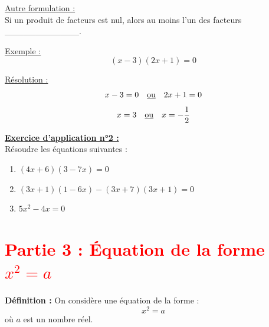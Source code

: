 \documentclass[12pt]{article}
\begin{document}
\underline{Autre formulation :}
\vspace{5pt}
\\Si un produit de facteurs est nul, alors 
au moins l'un des facteurs \_\_\_\_\_\_\_\_\_\_\_\_.

\vspace{10pt}

\underline{Exemple :}
\[
(x - 3)(2x + 1) = 0
\]

\vspace{5pt}

\underline{Résolution :}
\[
x - 3 = 0 \quad \text{\underline{ou}} \quad 2x + 1 = 0
\]
\[
x = 3 \quad \text{\underline{ou}} \quad x = -\frac{1}{2}
\]

\vspace{10pt}

\begin{mdframed}[
    linewidth=1pt,
    roundcorner=5pt,
    linecolor=RoyalBlue,
    innertopmargin=10pt,
    innerbottommargin=10pt
]
{\color{RoyalBlue}\textbf{\underline{Exercice d'application n°2 :}}}
\vspace{5pt}
\\
Résoudre les équations suivantes :
\begin{enumerate}
    \item $(4x + 6)(3 - 7x) = 0$
    \item $(3x + 1)(1 - 6x) - (3x + 7)(3x + 1) = 0$
    \item $5x^2 - 4x = 0$
\end{enumerate}
\end{mdframed}


\section*{\textcolor{red}{Partie 3 : Équation de la forme $x^2 = a$}}

\vspace{5pt}

\begin{mdframed}[
    linewidth=1pt,
    roundcorner=5pt,
    linecolor=ForestGreen
]
{\color{ForestGreen}\textbf{Définition :}}  
On considère une équation de la forme :
\[
x^2 = a
\]
où $a$ est un nombre réel.
\end{mdframed}

\vspace{10pt}
\end{document}
